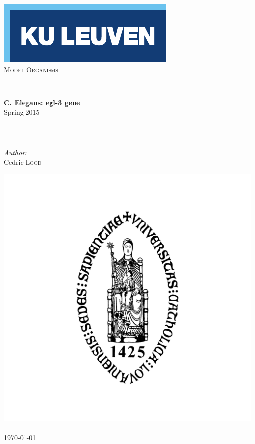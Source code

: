 \begin{titlepage}
  \begin{center}
    
    \includegraphics[scale=1.5]{Figures/kuleuven_logo.pdf}~\\[4.5cm]
    
    \textsc{\Large Model Organisms}\\[0.5cm]
    
    \rule{\linewidth}{0.3mm}\\[0.4cm]
    {\huge \bfseries C. Elegans: egl-3 gene} \\[0.4cm]
    {\large Spring 2015} \\[0.4cm]
    \rule{\linewidth}{0.3mm}\\[1.5cm]
    
    \begin{minipage}{0.4\textwidth}
      \begin{center} \large
        \emph{Author:}\\
        Cedric \textsc{Lood}\\
      \end{center}
    \end{minipage}
    
    \vfill
    
    \includegraphics[scale=0.15]{Figures/KUL.jpg}~\\[0.5cm]

    {\large \today}
    
  \end{center}
\end{titlepage}
